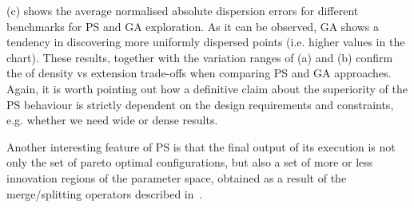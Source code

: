 (c) shows the average normalised absolute
dispersion errors for different benchmarks for PS and GA
exploration. As it can be observed, GA shows a tendency in
discovering more uniformly dispersed points (i.e. higher values in the
chart). These results, together with the variation ranges of (a) and
(b) confirm the of density vs extension trade-offs
when comparing PS and GA approaches. Again, it
is worth pointing out how a definitive claim about the superiority of
the PS behaviour is strictly dependent on the design 
requirements and constraints, e.g. whether we need wide or dense
results.  

Another interesting feature of PS is that the final output of its
execution is not only the set of pareto optimal configurations, but also a set
of more or less innovation regions of the parameter space, obtained as
a result of the merge/splitting operators described
in~.



